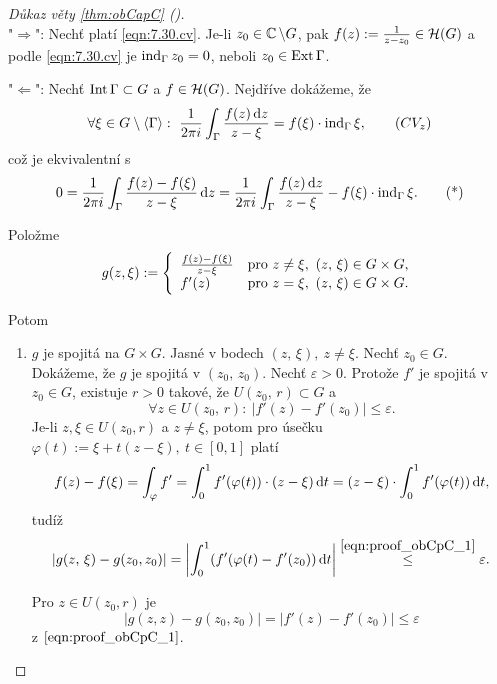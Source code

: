 \begin{proof}[Důkaz věty \cref{thm:obCapC} ()]
\mbox{}\\
    "$\Longrightarrow$": Nechť platí \cref{eqn:7.30.cv}. Je-li $z_0\in\operatorname{\mathbb{C}}\setminus G$, pak $f(z):=\frac{1}{z-z_0}\in\operatorname{\mathcal{H}} (G)$ a podle \cref{eqn:7.30.cv} je $\operatorname{ind}_\Gamma z_0=0$, neboli $z_0\in \operatorname{Ext}\Gamma$.
    
    "$\Longleftarrow$": Nechť $\operatorname{Int}\Gamma\subset G$ a $f\in \operatorname{\mathcal{H}} (G)$. Nejdříve dokážeme, že 
    \begin{equation}
        \forall\xi\in G\setminus\langle\Gamma\rangle:\ 
        \frac{1}{2\pi i}\int_\Gamma\frac{f(z) \diff z}{z-\xi}=f(\xi)\cdot\ind_\Gamma \xi,
        \label{eqn:10.8:cvz} 
        \tag{$CV_z$}
    \end{equation}
    což je ekvivalentní s 
    \begin{equation}
        0=\frac{1}{2\pi i}\int_\Gamma\frac{f(z) -f(\xi)}{z-\xi}\mathop{}\!\mathrm{d} z=\frac{1}{2\pi i}\int_\Gamma\frac{f(z) \mathop{}\!\mathrm{d} z}{z-\xi}-f(\xi)\cdot\operatorname{ind}_\Gamma \xi.
        \tag{*}
        \label{eqn:proof_obCapC_ekviv}
    \end{equation}
    
    Položme 
    $$g(z,\xi):=\twopartdef{\frac{f(z)-f(\xi)}{z-\xi}}{z\neq\xi,\ (z,\, \xi)\in G\times G,}{f'(z)}{z=\xi,\ (z,\, \xi)\in G\times G.}$$
    
    Potom 
    \begin{enumerate}[label=(\alph*)]
        \item $g$ je spojitá na $G\times G$. Jasné v bodech $(z,\, \xi),\ z\neq\xi.$ Nechť $z_0\in G$. Dokážeme, že $g$ je spojitá v $(z_0,\, z_0)$. Nechť $\varepsilon>0.$ Protože $f'$ je spojitá v $z_0\in G$, existuje $r>0$ takové, že $U(z_0,\, r)\subset G$ a 
        \begin{equation}
            \forall z \in U(z_0,\, r):\ 
            \left|f'(z)-f'(z_0)\right|\leq\varepsilon.
            \tag{$\times$}
            \label{eqn:proof_obCpC_1}
        \end{equation}
        Je-li $z,\xi\in U(z_0,r)$ a $z\neq\xi$, potom pro úsečku $\varphi(t):=\xi+t(z-\xi),\ t\in [0,1]$ platí 
        $$f(z)-f(\xi)=\int_\varphi f'=\int_0^1 f'(\varphi(t))\cdot(z-\xi)\mathop{}\!\mathrm{d} t=(z-\xi)\cdot\int_0^1 f'(\varphi(t))\mathop{}\!\mathrm{d} t,$$
        tudíž 
        $$|g(z,\, \xi)-g(z_0,z_0)|=\left|\int_0^1(f'(\varphi(t)-f'(z_0))\diff t \right|\stackrel{\cref{eqn:proof_obCpC_1}}{\leq}\varepsilon.$$
        
        Pro $z\in U(z_0,r)$ je
        $$|g(z,z)-g(z_0,z_0)|=|f'(z)-f'(z_0)|\leq \varepsilon$$ z $\cref{eqn:proof_obCpC_1}$.
        

\end{enumerate}
\end{proof}
